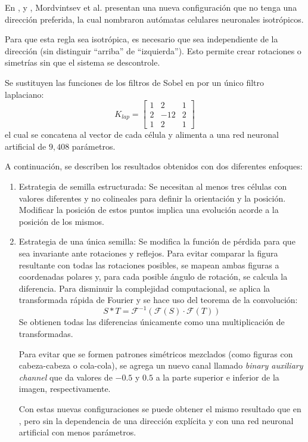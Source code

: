 En \cite{mordvintsev2022_iso_nca}, \cite{mordvintsev2022_iso_nca2} y \cite{mordvintsev2023_snca}, Mordvintsev et al. presentan una nueva configuración que no tenga una dirección preferida, la cual nombraron autómatas celulares neuronales isotrópicos.

Para que esta regla sea isotrópica, es necesario que sea independiente de la dirección (sin distinguir ``arriba'' de ``izquierda''). Esto permite crear rotaciones o simetrías sin que el sistema se descontrole.

Se sustituyen las funciones de los filtros de Sobel en \cite{mordvintsev2020_nca} por un único filtro laplaciano:
\[
K_{lap} = \begin{bmatrix}
	1 & 2 & 1 \\
	2 & -12 & 2 \\
	1 & 2 & 1 	
\end{bmatrix}
\]
el cual se concatena al vector de cada célula y alimenta a una red neuronal artificial de $9{,}408$ parámetros. 

A continuación, se describen los resultados obtenidos con dos diferentes enfoques:
\begin{enumerate}
	\item Estrategia de semilla estructurada: Se necesitan al menos tres células con valores diferentes y no colineales para definir la orientación y la posición. Modificar la posición de estos puntos implica una evolución acorde a la posición de los mismos.
	
	\item Estrategia de una única semilla: Se modifica la función de pérdida para que sea invariante ante rotaciones y reflejos. Para evitar comparar la figura resultante con todas las rotaciones posibles, se mapean ambas figuras a coordenadas polares y, para cada posible ángulo de rotación, se calcula la diferencia. Para disminuir la complejidad computacional, se aplica la transformada rápida de Fourier y se hace uso del teorema de la convolución:
	\[
	S * T = \mathcal{F}^{-1} (\mathcal{F}(S) \cdot \mathcal{F}(T)) 
	\]
	Se obtienen todas las diferencias únicamente como una multiplicación de transformadas.
	
	Para evitar que se formen patrones simétricos mezclados (como figuras con cabeza-cabeza o cola-cola), se agrega un nuevo canal llamado \textit{binary auxiliary channel} que da valores de $-0.5$ y $0.5$ a la parte superior e inferior de la imagen, respectivamente.
	
	Con estas nuevas configuraciones se puede obtener el mismo resultado que en \cite{mordvintsev2020_nca}, pero sin la dependencia de una dirección explícita y con una red neuronal artificial con menos parámetros.
	
\end{enumerate}


